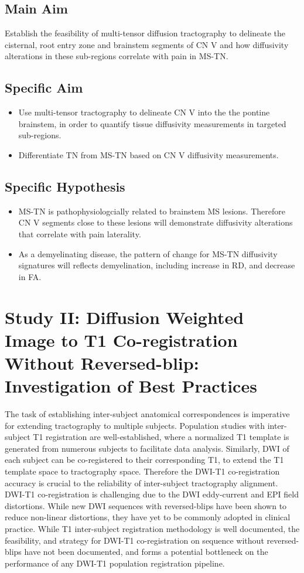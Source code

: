 \subsection{Main Aim} 
Establish the feasibility of multi-tensor diffusion tractography to delineate the cisternal, root entry zone and brainstem segments of CN V and how diffusivity alterations in these sub-regions correlate with pain in MS-TN.

\subsection{Specific Aim}
\begin{itemize}
    \item Use multi-tensor tractography to delineate CN V into the the pontine brainstem, in order to quantify tissue diffusivity measurements in targeted sub-regions.
    \item Differentiate TN from MS-TN based on CN V diffusivity measurements.
\end{itemize}

\subsection{Specific Hypothesis}
\begin{itemize}
    \item MS-TN is pathophysiologcially related to brainstem MS lesions. Therefore CN V segments close to these lesions will demonstrate diffusivity alterations that correlate with pain laterality.
    \item As a demyelinating disease, the pattern of change for MS-TN diffusivity signatures will reflects demyelination, including increase in RD, and decrease in FA. 
\end{itemize}

\section[Study II]{Study II: Diffusion Weighted Image to T1 Co-registration Without Reversed-blip: Investigation of Best Practices}
The task of establishing inter-subject anatomical correspondences is imperative for extending tractography to multiple subjects. Population studies with inter-subject T1 registration are well-established, where a normalized T1 template is generated from numerous subjects to facilitate data analysis. Similarly, DWI of each subject can be co-registered to their corresponding T1, to extend the T1 template space to tractography space. Therefore the DWI-T1 co-registration accuracy is crucial to the reliability of inter-subject tractography alignment. DWI-T1 co-registration is challenging due to the DWI eddy-current and EPI field distortions. While new DWI sequences with reversed-blips have been shown to reduce non-linear distortions, they have yet to be commonly adopted in clinical practice. While T1 inter-subject registration methodology is well documented, the feasibility, and strategy for DWI-T1 co-registration on sequence without reversed-blips have not been documented, and forms a potential bottleneck on the performance of any DWI-T1 population registration pipeline.

